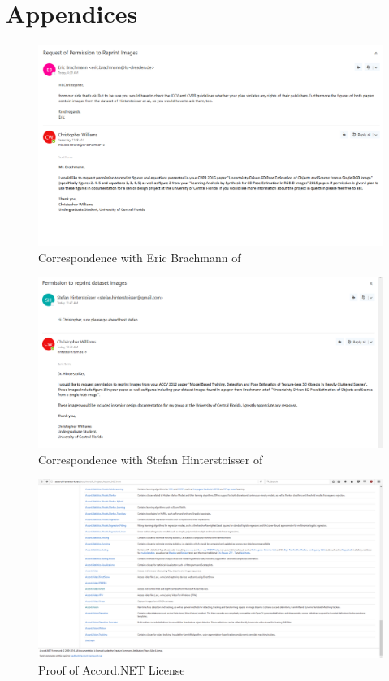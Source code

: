\documentclass[12pt]{article}
\begin{document}
\section{Appendices}\label{appendices}

\begin{figure}
\centering
\includegraphics{Pictures/brachmannPermission.png}
\caption{Correspondence with Eric Brachmann of \autocite{bachmann}}
\end{figure}

\begin{figure}
\centering
\includegraphics{Pictures/hinterstoisserPermission.png}
\caption{Correspondence with Stefan Hinterstoisser of
\autocite{hinterstoisser}}
\end{figure}

\begin{figure}
\centering
\includegraphics{Pictures/accordLicense.png}
\caption{Proof of Accord.NET License}
\end{figure}
\end{document}
